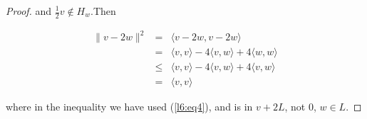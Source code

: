 \begin{proof}
and $\frac{1}{2}v\notin H_w$.Then

$$\begin{array}{rcl}
   \|v-2w\|^2 	&=		&\langle v-2w,v-2w\rangle \\
		&=		&\langle v,v\rangle - 4 \langle v,w\rangle + 4 \langle w,w\rangle\\
		&\leqslant	&\langle v,v\rangle - 4 \langle v,w\rangle + 4 \langle v,w\rangle\\
		&=		&\langle v,v\rangle
  \end{array}
$$

where in the inequality we have used (\ref{l6:eq4}), and is in $v+2L$, not $0$, $w\in L$.

\end{proof}



